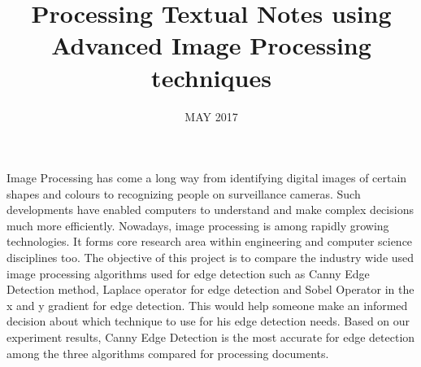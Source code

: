 \documentclass[BTech]{srmuthesis}
\begin{document}

\title{Processing Textual Notes using Advanced Image Processing techniques} %

\firstauthorregno{[Reg No: 1081310154]}
\secondauthorregno{[Reg No: 1081310234]}
\thirdauthorregno{[Reg No: 1081310257]}
\date{MAY 2017} %

\maketitle
\certificate





\abstract
\begin{doublespacing}
{\large\noindent Image Processing has come a long way from identifying digital images of certain shapes and colours to recognizing people on surveillance cameras. Such developments have enabled computers to understand and make complex decisions much more efficiently. Nowadays, image processing is among rapidly
growing technologies. It forms core research area within engineering and computer science disciplines too. The objective of this project is to compare the industry wide used image processing algorithms used for edge detection such as Canny Edge Detection method, Laplace operator for edge detection and Sobel Operator in the x and y gradient for edge detection. This would help someone make an informed decision about which technique to use for his edge detection needs. Based on our experiment results, Canny Edge Detection is the most accurate for edge detection among the three algorithms compared for processing documents.}

\end{doublespacing}
\end{document}
